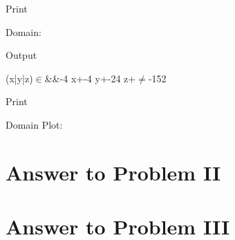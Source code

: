 \documentclass[11pt,a4paper]{article}
\begin{document}
%
%
%  
%
%
%
%
%
%
%
%
%
%
%
%
%  
%



\begin{mmaCell}{Print}

  Domain:

\end{mmaCell}



\begin{mmaCell}[addtoindex=5]{Output}

  (x|y|z)$\in$&&-4 x+-4 y+-24 z+$\neq$-152

\end{mmaCell}



\begin{mmaCell}{Print}

  Domain Plot:

\end{mmaCell}


\clearpage

\section{Answer to Problem II}\label{sec:P02}



\clearpage

\section{Answer to Problem III}\label{sec:P03}
\end{document}
